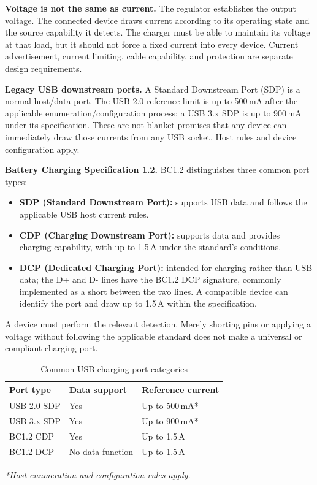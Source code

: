 \documentclass[journal,12pt,twocolumn]{IEEEtran}
\begin{document}
\textbf{Voltage is not the same as current.} The regulator establishes
the output voltage. The connected device draws current according
to its operating state and the source capability it detects. The
charger must be able to maintain its voltage at that load, but it
should not force a fixed current into every device. Current
advertisement, current limiting, cable capability, and protection
are separate design requirements.

\textbf{Legacy USB downstream ports.}
A Standard Downstream Port (SDP) is a normal host/data port. The
USB 2.0 reference limit is up to 500\,mA after the applicable
enumeration/configuration process; a USB 3.x SDP is up to 900\,mA
under its specification. These are not blanket promises that any
device can immediately draw those currents from any USB socket.
Host rules and device configuration apply.

\textbf{Battery Charging Specification 1.2.}
BC1.2 distinguishes three common port types:
\begin{itemize}[leftmargin=1.5em]
    \item \textbf{SDP (Standard Downstream Port):} supports USB data
    and follows the applicable USB host current rules.
    \item \textbf{CDP (Charging Downstream Port):} supports data and
    provides charging capability, with up to 1.5\,A under the
    standard's conditions.
    \item \textbf{DCP (Dedicated Charging Port):} intended for
    charging rather than USB data; the D+ and D- lines have the
    BC1.2 DCP signature, commonly implemented as a short between
    the two lines. A compatible device can identify the port and
    draw up to 1.5\,A within the specification.
\end{itemize}
A device must perform the relevant detection. Merely shorting pins
or applying a voltage without following the applicable standard
does not make a universal or compliant charging port.

\begin{table}[!t]
\centering
\caption{Common USB charging port categories}
\label{tab:usb-port-types}
\small
\begin{tabular}{|p{}|p{}|p{}|}
\hline
\textbf{Port type} & \textbf{Data support} & \textbf{Reference current}\\ \hline
USB 2.0 SDP & Yes & Up to 500\,mA*\\ \hline
USB 3.x SDP & Yes & Up to 900\,mA*\\ \hline
BC1.2 CDP & Yes & Up to 1.5\,A\\ \hline
BC1.2 DCP & No data function & Up to 1.5\,A\\ \hline
\end{tabular}
\end{table}
\smallskip
\noindent\textit{*Host enumeration and configuration rules apply.}
\end{document}
